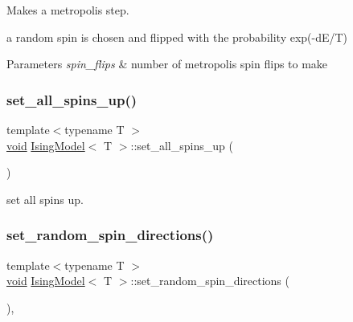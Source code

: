 Makes a metropolis step. 

a random spin is chosen and flipped with the probability exp(-\/d\+E/T) 
\begin{DoxyParams}{Parameters}
{\em spin\+\_\+flips} & number of metropolis spin flips to make \\
\hline
\end{DoxyParams}
\mbox{\label{classIsingModel_ac16bfdd5bb4012162bedd90034962f58}} 
\subsubsection{\texorpdfstring{set\+\_\+all\+\_\+spins\+\_\+up()}{set\_all\_spins\_up()}}
{\footnotesize\ttfamily template$<$typename T $>$ \\
\mbox{\hyperlink{glad_8h_a950fc91edb4504f62f1c577bf4727c29}{void}} \mbox{\hyperlink{classIsingModel}{Ising\+Model}}$<$ T $>$\+::set\+\_\+all\+\_\+spins\+\_\+up (\begin{DoxyParamCaption}{ }\end{DoxyParamCaption})\hspace{0.3cm}{\ttfamily [inline]}}



set all spins up. 

\mbox{\label{classIsingModel_a6ab9293015326da93fb6e3e20d24edf8}} 
\subsubsection{\texorpdfstring{set\+\_\+random\+\_\+spin\+\_\+directions()}{set\_random\_spin\_directions()}}
{\footnotesize\ttfamily template$<$typename T $>$ \\
\mbox{\hyperlink{glad_8h_a950fc91edb4504f62f1c577bf4727c29}{void}} \mbox{\hyperlink{classIsingModel}{Ising\+Model}}$<$ T $>$\+::set\+\_\+random\+\_\+spin\+\_\+directions (\begin{DoxyParamCaption}{ }\end{DoxyParamCaption})\hspace{0.3cm}{\ttfamily [inline]}, {\ttfamily [private]}}



